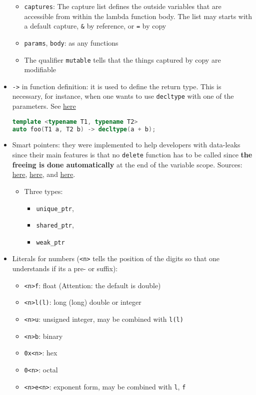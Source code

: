 \documentclass[a4paper,12pt,%
              final%
              ]{article}
\begin{document}
\begin{itemize}
    \begin{itemize}
      \item \verb|captures|: The capture list defines the outside variables that are accessible from within the lambda function body. The list may starts with a default capture, \verb|&| by reference, or \verb|=| by copy
      \item \verb|params|, \verb|body|: as any functions
      \item The qualifier \texttt{mutable} tells that the things captured by copy are modifiable
    \end{itemize}
  \item \texttt{->} in function definition: it is used to define the return type. This is necessary, for instance, when one wants to use \texttt{decltype} with one of the parameters. See \href{https://stackoverflow.com/a/22515589/12152457}{here}
    \begin{lstlisting}[language=C++]
template <typename T1, typename T2>
auto foo(T1 a, T2 b) -> decltype(a + b);
    \end{lstlisting}
  \item Smart pointers: they were implemented to help developers with data-leaks since their main features is that no \texttt{delete} function has to be called since \textbf{the freeing is done automatically} at the end of the variable scope. Sources: \href{https://www.geeksforgeeks.org/smart-pointers-cpp/}{here}, \href{https://www.internalpointers.com/post/beginner-s-look-smart-pointers-modern-c}{here}, and \href{https://docs.microsoft.com/en-us/cpp/cpp/smart-pointers-modern-cpp?view=msvc-170}{here}.
      \begin{itemize}
        \item Three types:
          \begin{itemize}
            \item \verb|unique_ptr|,
            \item \verb|shared_ptr|,
            \item \verb|weak_ptr|
          \end{itemize}
      \end{itemize}
  \item Literals for numbers (\texttt{<n>} tells the position of the digits so that one understands if its a pre- or suffix):
    \begin{itemize}
      \item \texttt{<n>f}: float (Attention: the default is double)
      \item \texttt{<n>l(l)}: long (long) double or integer
      \item \texttt{<n>u}: unsigned integer, may be combined with \texttt{l(l)}
      \item \texttt{<n>b}: binary
      \item \texttt{0x<n>}: hex
      \item \texttt{0<n>}: octal
      \item \texttt{<n>e<n>}: exponent form, may be combined with \texttt{l}, \texttt{f}
    \end{itemize}
\end{itemize}
\end{document}
